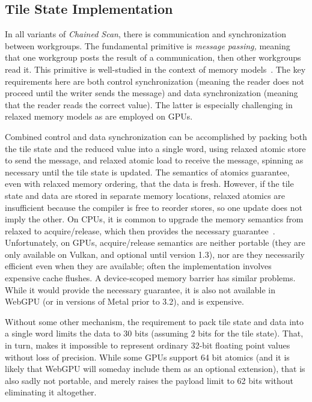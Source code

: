 \documentclass[acmsmall, manuscript, screen, review, anonymous]{acmart}
\begin{document}
\subsection{Tile State Implementation}
In all variants of \emph{Chained Scan}, there is communication and synchronization between workgroups. The fundamental primitive is \emph{message passing,} meaning that one workgroup posts the result of a communication, then other workgroups read it. This primitive is well-studied in the context of memory models~\cite{Alglave0, MCMutants}. The key requirements here are both control synchronization (meaning the reader does not proceed until the writer sends the message) and data synchronization (meaning that the reader reads the correct value). The latter is especially challenging in relaxed memory models as are employed on GPUs.

Combined control and data synchronization can be accomplished by packing both the tile state and the reduced value into a single word, using relaxed atomic store to send the message, and relaxed atomic load to receive the message, spinning as necessary until the tile state is updated. The semantics of atomics guarantee, even with relaxed memory ordering, that the data is fresh. However, if the tile state and data are stored in separate memory locations, relaxed atomics are insufficient because the compiler is free to reorder stores, so one update does not imply the other. On CPUs, it is common to upgrade the memory semantics from relaxed to acquire/release, which then provides the necessary guarantee~\cite[Section 10.2]{intel_sdm_2024}. Unfortunately, on GPUs, acquire/release semantics are neither portable (they are only available on Vulkan, and optional until version 1.3), nor are they necessarily efficient even when they are available; often the implementation involves expensive cache flushes. A device-scoped memory barrier has similar problems. While it would provide the necessary guarantee, it is also not available in WebGPU (or in versions of Metal prior to 3.2), and is expensive.

Without some other mechanism, the requirement to pack tile state and data into a single word limits the data to 30 bits (assuming 2 bits for the tile state). That, in turn, makes it impossible to represent ordinary 32-bit floating point values without loss of precision. While some GPUs support 64 bit atomics (and it is likely that WebGPU will someday include them as an optional extension), that is also sadly not portable, and merely raises the payload limit to 62 bits without eliminating it altogether.
\end{document}
